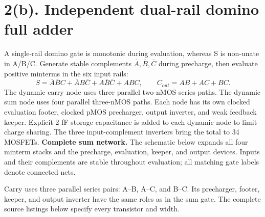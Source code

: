 \documentclass[11pt,a4paper]{article}
\newcommand{\VDD}{V_{\mathrm{DD}}}
\newcommand{\VSS}{V_{\mathrm{SS}}}
\newcommand{\MOS}[5]{
  \coordinate (#1) at (#2,#3);
  \coordinate (#1t) at ($(#1)+(0,.55)$);
  \coordinate (#1b) at ($(#1)+(0,-.55)$);
  \draw (#1t)--($(#1)+(0,.30)$)--($(#1)+(-.18,.30)$);
  \draw ($(#1)+(-.18,.34)$)--($(#1)+(-.18,-.34)$);
  \draw ($(#1)+(-.18,-.30)$)--($(#1)+(0,-.30)$)--(#1b);
  \draw ($(#1)+(-.35,.33)$)--($(#1)+(-.35,-.33)$);
  \def\type{#5}\def\ptype{p}
  \ifx\type\ptype
    \draw ($(#1)+(-.78,0)$)--($(#1)+(-.53,0)$);
    \draw ($(#1)+(-.465,0)$) circle (.065);
    \draw ($(#1)+(-.40,0)$)--($(#1)+(-.35,0)$);
  \else
    \draw ($(#1)+(-.78,0)$)--($(#1)+(-.35,0)$);
  \fi
  \node[anchor=east] at ($(#1)+(-.82,0)$) {$#4$};
  \node[anchor=west,font=\scriptsize] at ($(#1)+(.10,0)$) {#1};
}
\begin{document}
\section*{2(b). Independent dual-rail domino full adder}
A single-rail domino gate is monotonic during evaluation, whereas S is non-unate in A/B/C. Generate stable complements $\bar A,\bar B,\bar C$ during precharge, then evaluate positive minterms in the six input rails:
\[
 S=\bar A\bar B C+\bar A B\bar C+A\bar B\bar C+ABC,
 \qquad C_{out}=AB+AC+BC.
\]
The dynamic carry node uses three parallel two-nMOS series paths. The dynamic sum node uses four parallel three-nMOS paths. Each node has its own clocked evaluation footer, clocked pMOS precharger, output inverter, and weak feedback keeper. Explicit 2 fF storage capacitance is added to each dynamic node to limit charge sharing. The three input-complement inverters bring the total to 34 MOSFETs.
\newpage
\textbf{Complete sum network.} The schematic below expands all four minterm stacks and the precharge, evaluation, keeper, and output devices. Inputs and their complements are stable throughout evaluation; all matching gate labels denote connected nets.
\begin{center}\end{center}
Carry uses three parallel series pairs: A--B, A--C, and B--C. Its precharger, footer, keeper, and output inverter have the same roles as in the sum gate. The complete source listings below specify every transistor and width.
\end{document}
